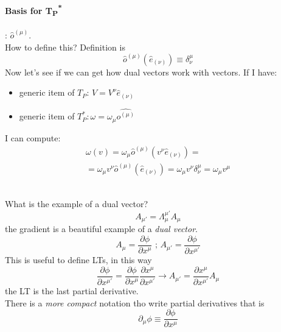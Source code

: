 \paragraph{Basis for T\textsubscript{P}\textsuperscript{*}}: $\hat{o}^{\left( \mu  \right)}$. \\
How to define this? Definition is
\[
\hat{o}^{\left( \mu  \right)}\left( \hat{e}_{\left( \nu  \right)} \right) \equiv \delta^{\mu }_{\nu }
\]
Now let's see if we can get how dual vectors work with vectors.
If I have:
\begin{itemize}
	\item generic item of $T_{P}$: $V = V^{\nu }\hat{e}_{\left( \nu  \right)}$
	\item generic item of $T_{P}^{*}: \omega = \omega_{\mu }\hat{o^{\left( \mu  \right)}}$ 
\end{itemize} 

I can compute:
\begin{gather*}
\omega \left( v \right) = \omega_{\mu }\hat{o}^{\left( \mu  \right)}\left( v^{\nu }\hat{e}_{\left( \nu  \right)} \right) =  \\
= \omega_{\mu }v^{\nu }\hat{o}^{\left( \mu  \right)}\left( \hat{e}_{\left( \nu  \right)} \right) = \omega_{\mu } v^{\nu } \delta^{\mu}_{\nu } = \omega_{\mu }v^{\mu }
\end{gather*}

\noindent{} \\

What is the example of a dual vector? \\
\[
A_{\mu '} = \Lambda_{\mu }^{\mu '} A_{\mu }
\]
the gradient is a beautiful example of a \emph{dual vector}.
\[
A_{\mu } = \frac{\partial\phi }{\partial x^{\mu }} \text{  ;   } A_{\mu '} = \frac{\partial\phi }{\partial x^{\mu '}}
\]
This is useful to define LTs, in this way
\[
\frac{\partial\phi }{\partial x^{\mu '}} = \frac{\partial\phi }{\partial x^{\mu }} \frac{\partial x^{\mu }}{\partial x^{\mu '}} \to A_{\mu '} = \frac{\partial x^{\mu }}{\partial x^{\mu '}}A_{\mu }
\]
the LT is the last partial derivative. \\

There is a \emph{more compact} notation tho write partial derivatives that is
\[
\partial_{\mu } \phi \equiv \frac{\partial\phi }{\partial x^{\mu }}
\]

